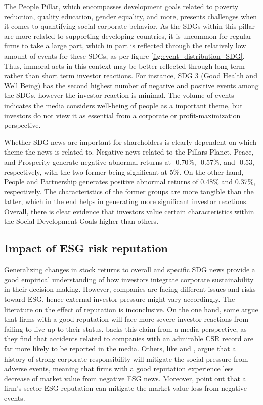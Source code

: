 The People Pillar, which encompasses development goals related to poverty reduction, quality education, gender equality, and more, presents challenges when it comes to quantifying social corporate behavior. As the SDGs within this pillar are more related to supporting developing countries, it is uncommon for regular firms to take a large part, which in part is reflected through the relatively low amount of events for these SDGs, as per figure \ref{fig:event_distribution_SDG}. Thus, immoral acts in this context may be better reflected through long term rather than short term investor reactions. For instance, SDG 3 (Good Health and Well Being) has the second highest number of negative and positive events among the SDGs, however the investor reaction is minimal. The volume of events indicates the media considers well-being of people as a important theme, but investors do not view it as essential from a corporate or profit-maximization perspective.   


Whether SDG news are important for shareholders is clearly dependent on which theme the news is related to. Negative news related to the Pillars Planet, Peace, and Prosperity generate negative abnormal returns at -0.70\%, -0.57\%, and -0.53, respectively, with the two former being significant at 5\%. On the other hand, People and Partnership generates positive abnormal returns of 0.48\% and 0.37\%, respectively. The characteristics of the former groups are more tangible than the latter, which in the end helps in generating more significant investor reactions. Overall, there is clear evidence that investors value certain characteristics within the Social Development Goals higher than others. 


\subsection{Impact of ESG risk reputation} \label{ESG_reputation}

Generalizing changes in stock returns to overall and specific SDG news provide a good empirical understanding of how investors integrate corporate sustainability in their decision making. However, companies are facing different issues and risks toward ESG, hence external investor pressure might vary accordingly. 
The literature on the effect of reputation is inconclusive. On the one hand, some argue that firms with a good reputation will face more severe investor reactions from failing to live up to their status. \cite{noNewsgoodnews} backs this claim from a media perspective, as they find that accidents related to companies with an admirable CSR record are far more likely to be reported in the media. Others, like \cite{flammer2013corporate} and \cite{godfrey2009relationship}, argue that a history of strong corporate responsibility will mitigate the social pressure from adverse events, meaning that firms with a good reputation experience less decrease of market value from negative ESG news. Moreover, \cite{Blancard_ESG_sentiment} point out that a firm's sector ESG reputation can mitigate the market value loss from negative events.  

